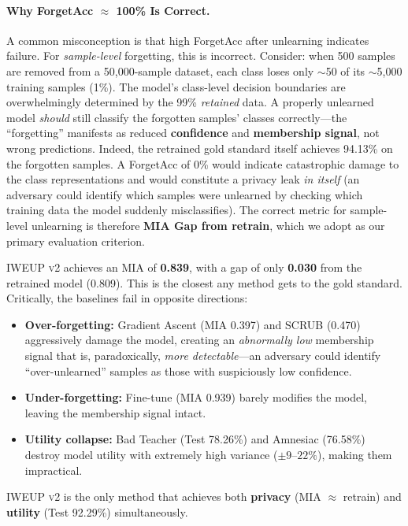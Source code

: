\documentclass[11pt]{article}
\newcommand{\method}{\textsc{IWEUP v2}}
\begin{document}
\paragraph{Why ForgetAcc $\approx$ 100\% Is Correct.}
A common misconception is that high ForgetAcc after unlearning indicates failure. For \textit{sample-level} forgetting, this is incorrect. Consider: when 500 samples are removed from a 50,000-sample dataset, each class loses only $\sim$50 of its $\sim$5,000 training samples (1\%). The model's class-level decision boundaries are overwhelmingly determined by the 99\% \textit{retained} data. A properly unlearned model \textit{should} still classify the forgotten samples' classes correctly---the ``forgetting'' manifests as reduced \textbf{confidence} and \textbf{membership signal}, not wrong predictions. Indeed, the retrained gold standard itself achieves 94.13\% on the forgotten samples. A ForgetAcc of 0\% would indicate catastrophic damage to the class representations and would constitute a privacy leak \textit{in itself} (an adversary could identify which samples were unlearned by checking which training data the model suddenly misclassifies). The correct metric for sample-level unlearning is therefore \textbf{MIA Gap from retrain}, which we adopt as our primary evaluation criterion.

\method{} achieves an MIA of \textbf{0.839}, with a gap of only \textbf{0.030} from the retrained model (0.809). This is the closest any method gets to the gold standard. Critically, the baselines fail in opposite directions:
\begin{itemize}[leftmargin=*]
    \item \textbf{Over-forgetting:} Gradient Ascent (MIA 0.397) and SCRUB (0.470) aggressively damage the model, creating an \textit{abnormally low} membership signal that is, paradoxically, \textit{more detectable}---an adversary could identify ``over-unlearned'' samples as those with suspiciously low confidence.
    \item \textbf{Under-forgetting:} Fine-tune (MIA 0.939) barely modifies the model, leaving the membership signal intact.
    \item \textbf{Utility collapse:} Bad Teacher (Test 78.26\%) and Amnesiac (76.58\%) destroy model utility with extremely high variance ($\pm 9$--$22\%$), making them impractical.
\end{itemize}

\method{} is the only method that achieves both \textbf{privacy} (MIA $\approx$ retrain) and \textbf{utility} (Test 92.29\%) simultaneously.
\end{document}
